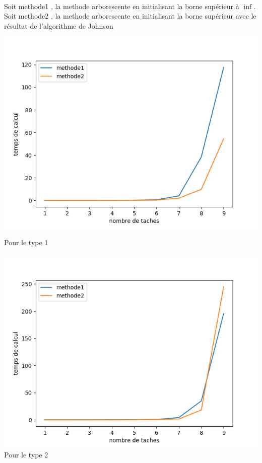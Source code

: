 \documentclass[a4paper, 10pt]{article}
\begin{document}
                \paragraph{}{
                  Soit methode1 , la methode arborescente en initialisant la borne supérieur à $\inf$.
                  Soit methode2 , la methode arborescente en initialisant la borne supérieur avec le résultat de l'algorithme de Johnson
                  
                  \includegraphics{graphes/exacte_vs_mix_type1.png}
                  }
                Pour le type 1
                \paragraph{}{
                  \includegraphics{graphes/exact_vs_mix_type2.png}
                  Pour le type 2
                }
\end{document}
